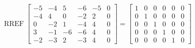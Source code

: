 \begin{exerciseAnswer} 


\[\operatorname{RREF} \left[\begin{array}{ccccc|c}
-5 & -4 & 5 & -6 & -5 & 0 \\
-4 & 4 & 0 & -2 & 2 & 0 \\
0 & -2 & 1 & -4 & 4 & 0 \\
3 & -1 & -6 & -6 & 4 & 0 \\
-2 & -3 & 2 & -3 & 4 & 0
\end{array}\right] = \left[\begin{array}{ccccc|c}
1 & 0 & 0 & 0 & 0 & 0 \\
0 & 1 & 0 & 0 & 0 & 0 \\
0 & 0 & 1 & 0 & 0 & 0 \\
0 & 0 & 0 & 1 & 0 & 0 \\
0 & 0 & 0 & 0 & 1 & 0
\end{array}\right] \]



\end{exerciseAnswer}
